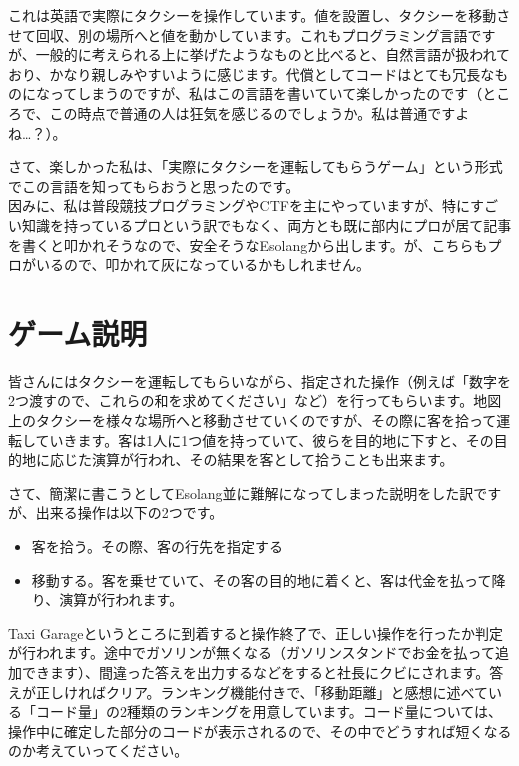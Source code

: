 \documentclass[12pt]{jsarticle}
\begin{document}
	これは英語で実際にタクシーを操作しています。値を設置し、タクシーを移動させて回収、別の場所へと値を動かしています。これもプログラミング言語ですが、一般的に考えられる上に挙げたようなものと比べると、自然言語が扱われており、かなり親しみやすいように感じます。代償としてコードはとても冗長なものになってしまうのですが、私はこの言語を書いていて楽しかったのです（ところで、この時点で普通の人は狂気を感じるのでしょうか。私は普通ですよね…？）。
	
	さて、楽しかった私は、「実際にタクシーを運転してもらうゲーム」という形式でこの言語を知ってもらおうと思ったのです。\\
	
	因みに、私は普段競技プログラミングやCTFを主にやっていますが、特にすごい知識を持っているプロという訳でもなく、両方とも既に部内にプロが居て記事を書くと叩かれそうなので、安全そうなEsolangから出します。が、こちらもプロがいるので、叩かれて灰になっているかもしれません。
	
		\section{ゲーム説明}
	
	皆さんにはタクシーを運転してもらいながら、指定された操作（例えば「数字を2つ渡すので、これらの和を求めてください」など）を行ってもらいます。地図上のタクシーを様々な場所へと移動させていくのですが、その際に客を拾って運転していきます。客は1人に1つ値を持っていて、彼らを目的地に下すと、その目的地に応じた演算が行われ、その結果を客として拾うことも出来ます。
	
	さて、簡潔に書こうとしてEsolang並に難解になってしまった説明をした訳ですが、出来る操作は以下の2つです。
	\begin{itemize}
		\item 客を拾う。その際、客の行先を指定する
		\item 移動する。客を乗せていて、その客の目的地に着くと、客は代金を払って降り、演算が行われます。
	\end{itemize}
	Taxi Garageというところに到着すると操作終了で、正しい操作を行ったか判定が行われます。途中でガソリンが無くなる（ガソリンスタンドでお金を払って追加できます）、間違った答えを出力するなどをすると社長にクビにされます。答えが正しければクリア。ランキング機能付きで、「移動距離」と感想に述べている「コード量」の2種類のランキングを用意しています。コード量については、操作中に確定した部分のコードが表示されるので、その中でどうすれば短くなるのか考えていってください。
	
\end{document}
